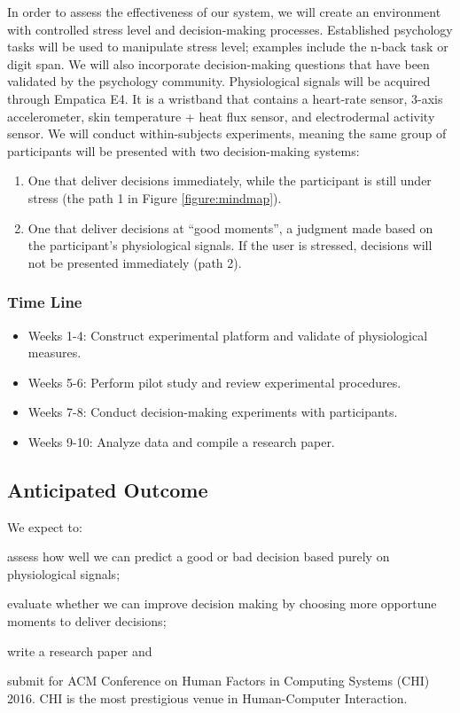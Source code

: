 \documentclass[12pt]{article}
\begin{document}
In order to assess the effectiveness of our system, we will create an environment with controlled stress level and decision-making processes. Established psychology tasks will be used to manipulate stress level; examples include the n-back task or digit span. We will also incorporate decision-making questions that have been validated by the psychology community. Physiological signals will be acquired through Empatica E4. It is a wristband that contains a heart-rate sensor, 3-axis accelerometer, skin temperature + heat flux sensor, and electrodermal activity sensor. We will conduct within-subjects experiments, meaning the same group of participants will be presented with two decision-making systems:
\begin{enumerate}
\itemsep1pt\parskip0pt
\item One that deliver decisions immediately, while the participant is still under stress (the path 1 in Figure \ref{figure:mindmap}). 
\item One that deliver decisions at ``good moments'', a judgment made based on the participant's physiological signals. If the user is stressed, decisions will not be presented immediately (path 2).
\end{enumerate}



\subsubsection{Time Line}
\begin{itemize} 
\itemsep0pt\parskip0pt
\item Weeks 1-4: Construct experimental platform and validate of physiological measures.
\item Weeks 5-6: Perform pilot study and review experimental procedures.
\item Weeks 7-8: Conduct decision-making experiments with participants.
\item Weeks 9-10: Analyze data and compile a research paper.
\end{itemize}


\subsection{Anticipated Outcome}\label{anticipated-outcome}
We expect to:
\begin{inparaenum}[\itshape 1\upshape)]
\item
  assess how well we can predict a good or bad decision based purely on physiological signals;
\item 
  evaluate whether we can improve decision making by choosing more opportune moments to deliver decisions;
\item
  write a research paper and
\item
  submit for ACM Conference on Human Factors in Computing Systems (CHI) 2016. CHI is the most prestigious venue in Human-Computer Interaction.
\end{inparaenum}
\end{document}
